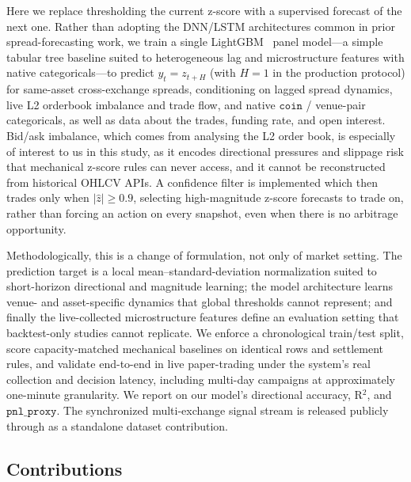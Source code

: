 Here we replace thresholding the current z-score with a supervised forecast of the next one. Rather than adopting the DNN/LSTM architectures common in prior spread-forecasting work, we train a single LightGBM~\cite{ke2017lightgbm} panel model---a simple tabular tree baseline suited to heterogeneous lag and microstructure features with native categoricals---to predict $y_t = z_{t+H}$ (with $H{=}1$ in the production protocol) for same-asset cross-exchange spreads, conditioning on lagged spread dynamics, live L2 orderbook imbalance and trade flow, and native $\texttt{coin}$ / venue-pair categoricals, as well as data about the trades, funding rate, and open interest. Bid/ask imbalance, which comes from analysing the L2 order book, is especially of interest to us in this study, as it encodes directional pressures and slippage risk that mechanical z-score rules can never access, and it cannot be reconstructed from historical OHLCV APIs. A confidence filter is implemented which then trades only when $|\hat{z}| \geq 0.9$, selecting high-magnitude z-score forecasts to trade on, rather than forcing an action on every snapshot, even when there is no arbitrage opportunity.

Methodologically, this is a change of formulation, not only of market setting. The prediction target is a local mean--standard-deviation normalization suited to short-horizon directional and magnitude learning; the model architecture learns venue- and asset-specific dynamics that global thresholds cannot represent; and finally the live-collected microstructure features define an evaluation setting that backtest-only studies cannot replicate. We enforce a chronological train/test split, score capacity-matched mechanical baselines on identical rows and settlement rules, and validate end-to-end in live paper-trading under the system's real collection and decision latency, including multi-day campaigns at approximately one-minute granularity. We report on our model's directional accuracy, R$^2$, and $\texttt{pnl\_proxy}$. The synchronized multi-exchange signal stream is released publicly through \datasetref as a standalone dataset contribution.

\subsection{Contributions}

